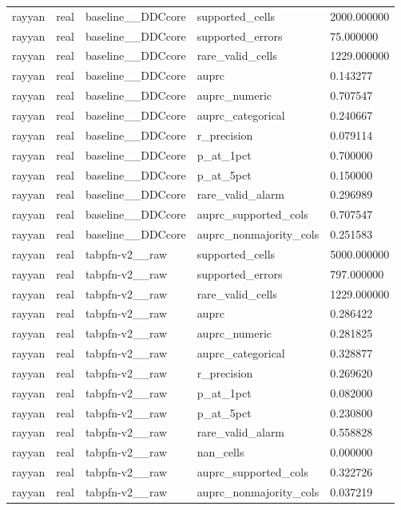 \begin{tabular}{lllll}
rayyan & real & baseline\_\_DDCcore & supported\_cells & 2000.000000 \\
rayyan & real & baseline\_\_DDCcore & supported\_errors & 75.000000 \\
rayyan & real & baseline\_\_DDCcore & rare\_valid\_cells & 1229.000000 \\
rayyan & real & baseline\_\_DDCcore & auprc & 0.143277 \\
rayyan & real & baseline\_\_DDCcore & auprc\_numeric & 0.707547 \\
rayyan & real & baseline\_\_DDCcore & auprc\_categorical & 0.240667 \\
rayyan & real & baseline\_\_DDCcore & r\_precision & 0.079114 \\
rayyan & real & baseline\_\_DDCcore & p\_at\_1pct & 0.700000 \\
rayyan & real & baseline\_\_DDCcore & p\_at\_5pct & 0.150000 \\
rayyan & real & baseline\_\_DDCcore & rare\_valid\_alarm & 0.296989 \\
rayyan & real & baseline\_\_DDCcore & auprc\_supported\_cols & 0.707547 \\
rayyan & real & baseline\_\_DDCcore & auprc\_nonmajority\_cols & 0.251583 \\
rayyan & real & tabpfn-v2\_\_raw & supported\_cells & 5000.000000 \\
rayyan & real & tabpfn-v2\_\_raw & supported\_errors & 797.000000 \\
rayyan & real & tabpfn-v2\_\_raw & rare\_valid\_cells & 1229.000000 \\
rayyan & real & tabpfn-v2\_\_raw & auprc & 0.286422 \\
rayyan & real & tabpfn-v2\_\_raw & auprc\_numeric & 0.281825 \\
rayyan & real & tabpfn-v2\_\_raw & auprc\_categorical & 0.328877 \\
rayyan & real & tabpfn-v2\_\_raw & r\_precision & 0.269620 \\
rayyan & real & tabpfn-v2\_\_raw & p\_at\_1pct & 0.082000 \\
rayyan & real & tabpfn-v2\_\_raw & p\_at\_5pct & 0.230800 \\
rayyan & real & tabpfn-v2\_\_raw & rare\_valid\_alarm & 0.558828 \\
rayyan & real & tabpfn-v2\_\_raw & nan\_cells & 0.000000 \\
rayyan & real & tabpfn-v2\_\_raw & auprc\_supported\_cols & 0.322726 \\
rayyan & real & tabpfn-v2\_\_raw & auprc\_nonmajority\_cols & 0.037219 \\

\end{tabular}
